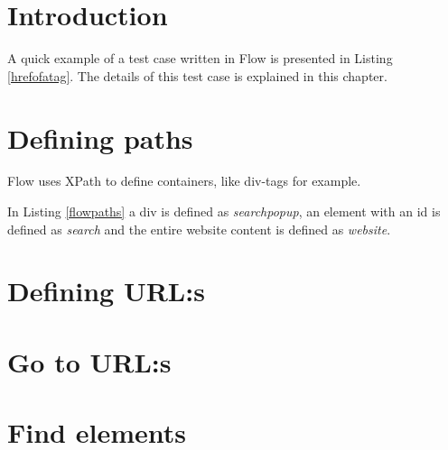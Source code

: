 \documentclass[a4paper,11pt]{kth-mag}
\begin{document}
\section{Introduction}
\label{flowintro}
A quick example of a test case written in Flow is presented in Listing \ref{hrefofatag}. The details of this test case is explained in this chapter.

\lstset{basicstyle=\footnotesize, caption=Find href of an a tag, label=hrefofatag, numbers=left, frame=single, captionpos=b}


\section{Defining paths}
Flow uses XPath to define containers, like div-tags for example.

\lstset{basicstyle=\footnotesize, caption=Defining XPaths, label=flowpaths, numbers=left, frame=single, captionpos=b}


In Listing \ref{flowpaths} a div is defined as \textit{searchpopup}, an element with an id is defined as \textit{search} and the entire website content is defined as \textit{website}.

\section{Defining URL:s}

\section{Go to URL:s}



\section{Find elements}






\end{document}
